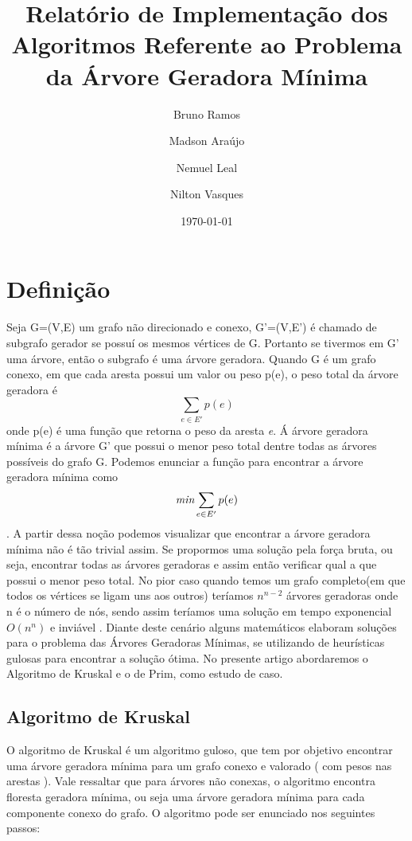 \documentclass[a4paper,12pt]{article}
\begin{document}
\title{Relatório de Implementação dos Algoritmos Referente ao Problema da Árvore Geradora Mínima}
\author{Bruno Ramos \and Madson Araújo \and Nemuel Leal \and Nilton Vasques}
\date{\today}
\maketitle

\section{Definição}
Seja G=(V,E) um grafo não direcionado e conexo, G'=(V,E') é chamado de subgrafo gerador se possuí os mesmos vértices de G. Portanto se tivermos em G' uma árvore, então o subgrafo é uma árvore geradora. 
Quando G é um grafo conexo, em que cada aresta possui um valor ou peso p(e), o peso total da árvore geradora é \[\sum_{e \in E'}p(e)\] onde p(e) é uma função que retorna o peso da aresta \emph{e}. Á árvore geradora mínima é a árvore G' que possui o menor peso total dentre todas as árvores possíveis do grafo G\cite{nogueira}. Podemos enunciar a função para encontrar a árvore geradora mínima como \[\emph{min}\sum_{e\in E'}p(e)\].
A partir dessa noção podemos visualizar que encontrar a árvore geradora mínima não é tão trivial assim. Se propormos uma solução pela força bruta, ou seja, encontrar todas as árvores geradoras e assim então verificar qual a que possui o menor peso total. No pior caso quando temos um grafo completo(em que todos os vértices se ligam uns aos outros) teríamos $n^{n-2}$ árvores geradoras onde n é o número de nós, sendo assim teríamos uma solução em tempo exponencial $O(n^n)$ e inviável \nocite{*}.
Diante deste cenário alguns matemáticos elaboram soluções para o problema das Árvores Geradoras Mínimas, se utilizando de heurísticas gulosas para encontrar a solução ótima. No presente artigo abordaremos o Algoritmo de Kruskal e o de Prim, como estudo de caso.

\subsection{Algoritmo de Kruskal}
O algoritmo de Kruskal é um algoritmo guloso, que tem por objetivo encontrar uma árvore geradora mínima para um grafo conexo e valorado ( com pesos nas arestas ). Vale ressaltar que para árvores não conexas, o algoritmo encontra floresta geradora mínima, ou seja uma árvore geradora mínima para cada componente conexo do grafo. O algoritmo pode ser enunciado nos seguintes passos:
\end{document}
